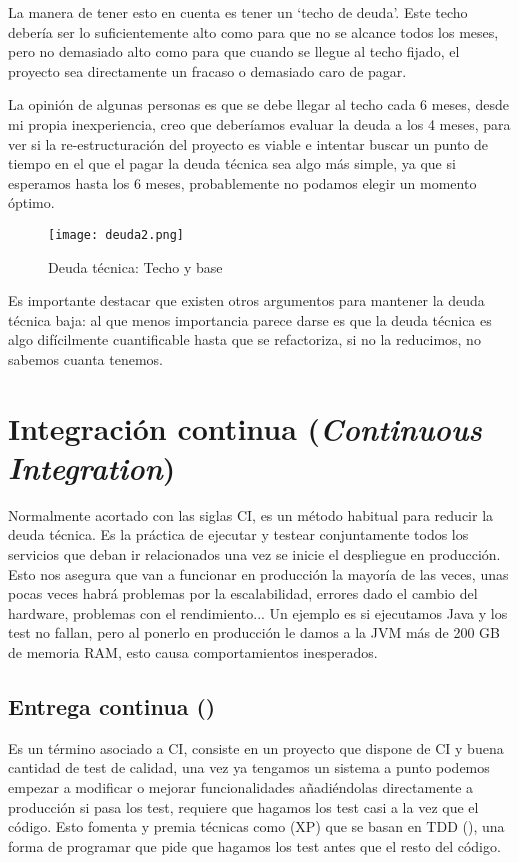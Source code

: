 La manera de tener esto en cuenta es tener un `techo de deuda'. Este techo debería ser lo suficientemente alto como para que no se alcance todos los meses, pero no demasiado alto como para que cuando se llegue al techo fijado, el proyecto sea directamente un fracaso o demasiado caro de pagar.

La opinión de algunas personas es que se debe llegar al techo cada 6 meses, desde mi propia inexperiencia, creo que deberíamos evaluar la deuda a los 4 meses, para ver si la re-estructuración del proyecto es viable e intentar buscar un punto de tiempo en el que el pagar la deuda técnica sea algo más simple, ya que si esperamos hasta los 6 meses, probablemente no podamos elegir un momento óptimo. 

\begin{figure}
	\centering
	\texttt{[image: deuda2.png]}
	\caption{Deuda técnica: Techo y base \cite{kni13}}\label{fig:deuda2.png}
\end{figure}

Es importante destacar que existen otros argumentos para mantener la deuda técnica baja: al que menos importancia parece darse es que la deuda técnica es algo difícilmente cuantificable hasta que se refactoriza, si no la reducimos, no sabemos cuanta tenemos.

\section{Integración continua (\textit{Continuous Integration})}

Normalmente acortado con las siglas CI, es un método habitual para reducir la deuda técnica. Es la práctica de ejecutar y testear conjuntamente todos los servicios que deban ir relacionados una vez se inicie el despliegue en producción. Esto nos asegura que van a funcionar en producción la mayoría de las veces, unas pocas veces habrá problemas por la escalabilidad, errores dado el cambio del hardware, problemas con el rendimiento... Un ejemplo es si ejecutamos Java y los test no fallan, pero al ponerlo en producción le damos a la JVM más de 200 GB de memoria RAM, esto causa comportamientos inesperados.

\subsection{Entrega continua ()}

Es un término asociado a CI, consiste en un proyecto que dispone de CI y buena cantidad de test de calidad, una vez ya tengamos un sistema a punto podemos empezar a modificar o mejorar funcionalidades añadiéndolas directamente a producción si pasa los test, requiere que hagamos los test casi a la vez que el código. Esto fomenta y premia técnicas como  (XP) que se basan en TDD (), una forma de programar que pide que hagamos los test antes que el resto del código.



